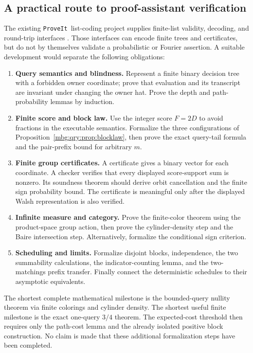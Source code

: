 \documentclass[11pt,letterpaper]{article}
\theoremstyle{definition}
\newcommand{\repo}{\texttt{ProveIt}}
\begin{document}
\subsection{A practical route to proof-assistant verification}

The existing \repo\ list-coding project supplies finite-list validity,
decoding, and round-trip interfaces \cite{qry:ListCoding}. Those interfaces
can encode finite trees and certificates, but do not by themselves
validate a probabilistic or Fourier assertion. A suitable development
would separate the following obligations:
\begin{enumerate}
\item \textbf{Query semantics and blindness.}
Represent a finite binary decision tree with a forbidden owner
coordinate; prove that evaluation and its transcript are invariant
under changing the owner hat. Prove the depth and path-probability
lemmas by induction.
\item \textbf{Finite score and block law.}
Use the integer score \(F=2D\) to avoid fractions in the executable
semantics. Formalize the three configurations of
Proposition~\ref{mbg:qry:prop:blocklaw}, then prove the exact query-tail
formula and the pair-prefix bound for arbitrary \(m\).
\item \textbf{Finite group certificates.}
A certificate gives a binary vector for each coordinate. A checker
verifies that every displayed score-support sum is nonzero. Its
soundness theorem should derive orbit cancellation and the finite
sign probability bound. The certificate is meaningful only after
the displayed Walsh representation is also verified.
\item \textbf{Infinite measure and category.}
Prove the finite-color theorem using the product-space group action,
then prove the cylinder-density step and the Baire intersection step.
Alternatively, formalize the conditional sign criterion.
\item \textbf{Scheduling and limits.}
Formalize disjoint blocks, independence, the two summability
calculations, the indicator-counting lemma, and the two-matchings
prefix transfer. Finally connect the deterministic schedules to
their asymptotic equivalents.
\end{enumerate}

The shortest complete mathematical milestone is the bounded-query
nullity theorem via finite colorings and cylinder density. The shortest
useful finite milestone is the exact one-query \(3/4\) theorem.
The expected-cost threshold then requires only the path-cost lemma
and the already isolated positive block construction. No claim is made
that these additional formalization steps have been completed.
\end{document}
